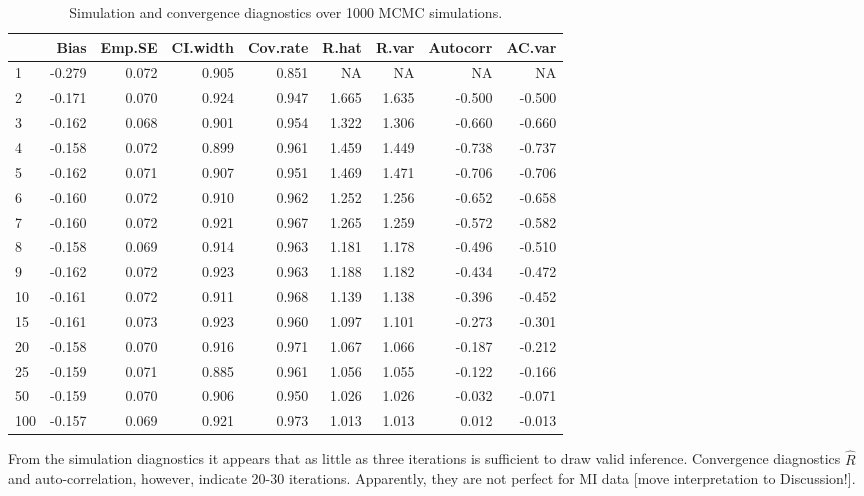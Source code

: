 \documentclass[article]{jss}
\begin{document}
\begin{table}[ht]
\centering
\caption{Simulation and convergence diagnostics over 1000 MCMC simulations.} 
\label{results}
\begin{tabular}{lrrrrrrrr}
  \hline
 & Bias & Emp.SE & CI.width & Cov.rate & R.hat & R.var & Autocorr & AC.var \\ 
  \hline
1 & -0.279 & 0.072 & 0.905 & 0.851 & NA & NA & NA & NA \\ 
  2 & -0.171 & 0.070 & 0.924 & 0.947 & 1.665 & 1.635 & -0.500 & -0.500 \\ 
  3 & -0.162 & 0.068 & 0.901 & 0.954 & 1.322 & 1.306 & -0.660 & -0.660 \\ 
  4 & -0.158 & 0.072 & 0.899 & 0.961 & 1.459 & 1.449 & -0.738 & -0.737 \\ 
  5 & -0.162 & 0.071 & 0.907 & 0.951 & 1.469 & 1.471 & -0.706 & -0.706 \\ 
  6 & -0.160 & 0.072 & 0.910 & 0.962 & 1.252 & 1.256 & -0.652 & -0.658 \\ 
  7 & -0.160 & 0.072 & 0.921 & 0.967 & 1.265 & 1.259 & -0.572 & -0.582 \\ 
  8 & -0.158 & 0.069 & 0.914 & 0.963 & 1.181 & 1.178 & -0.496 & -0.510 \\ 
  9 & -0.162 & 0.072 & 0.923 & 0.963 & 1.188 & 1.182 & -0.434 & -0.472 \\ 
  10 & -0.161 & 0.072 & 0.911 & 0.968 & 1.139 & 1.138 & -0.396 & -0.452 \\ 
  15 & -0.161 & 0.073 & 0.923 & 0.960 & 1.097 & 1.101 & -0.273 & -0.301 \\ 
  20 & -0.158 & 0.070 & 0.916 & 0.971 & 1.067 & 1.066 & -0.187 & -0.212 \\ 
  25 & -0.159 & 0.071 & 0.885 & 0.961 & 1.056 & 1.055 & -0.122 & -0.166 \\ 
  50 & -0.159 & 0.070 & 0.906 & 0.950 & 1.026 & 1.026 & -0.032 & -0.071 \\ 
  100 & -0.157 & 0.069 & 0.921 & 0.973 & 1.013 & 1.013 & 0.012 & -0.013 \\ 
   \hline %
\end{tabular}
\end{table}


From the simulation diagnostics it appears that as little as three iterations is sufficient to draw valid inference. Convergence diagnostics $\widehat{R}$ and auto-correlation, however, indicate 20-30 iterations. Apparently, they are not perfect for MI data [move interpretation to Discussion!]. 
\end{document}
